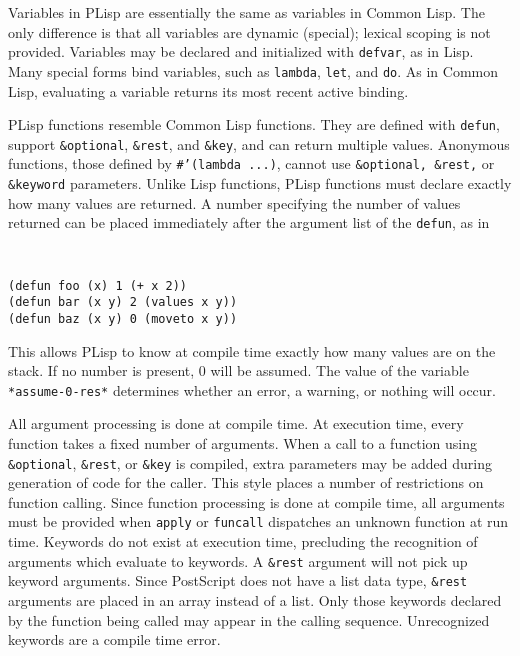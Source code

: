 Variables in PLisp are essentially the same as variables in Common Lisp.
The only difference is that all variables are dynamic (special); lexical
scoping is not provided.  Variables may be declared and initialized with
{\tt defvar}, as in Lisp.  Many special forms bind
variables, such as {\tt lambda}, {\tt let}, and {\tt do}.  As in
Common Lisp, evaluating 
a variable returns its most recent active binding.

PLisp functions resemble Common Lisp functions.  They are defined with
{\tt defun}, support {\tt \&optional}, {\tt \&rest}, and {\tt \&key},
and can return multiple values.
Anonymous functions, those defined by {\tt \#'(lambda ...)}, cannot
use {\tt \&optional, \&rest,} or {\tt \&keyword} parameters.
Unlike Lisp functions, PLisp functions must
declare exactly how many values are returned.  A number specifying the
number of values returned can be placed immediately after the argument
list of the {\tt defun}, as in
{\tt
\begin{verbatim}
(defun foo (x) 1 (+ x 2))
(defun bar (x y) 2 (values x y))
(defun baz (x y) 0 (moveto x y))
\end{verbatim} }
This allows PLisp to know at compile time exactly how many values are
on the stack.  If no number is present, 0 will be assumed.  The value
of the variable {\verb+*assume-0-res*+} determines whether an error, a
warning, or nothing will occur.

All argument processing is done at compile time.  At execution time,
every function takes a fixed number of arguments.  
When a call to a function using {\tt \&optional},
{\tt \&rest}, or {\tt \&key} is compiled, extra parameters may be added during
generation of code for the caller.
This style places a number of restrictions on function calling.
Since function
processing is done at compile time, all arguments must be provided when
{\tt apply} or {\tt funcall} dispatches an unknown function at run time.
Keywords do not exist at execution time,
precluding the recognition of arguments which evaluate to keywords.  A
{\tt \&rest}
argument will not pick up keyword arguments.  Since PostScript
does not have a list data type, {\tt \&rest} arguments are
placed in an array instead of a list.  Only those keywords declared
by the function being called may appear in the calling sequence.
Unrecognized keywords are a compile time error.

